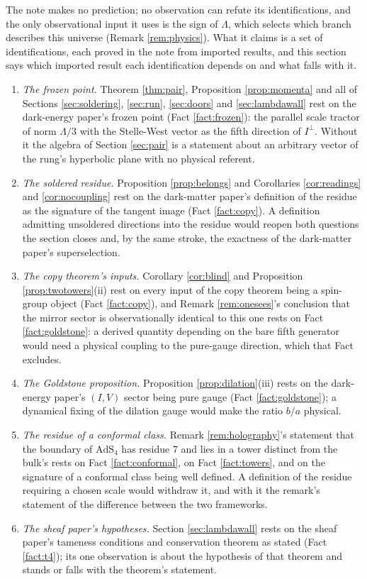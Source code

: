 \documentclass[11pt]{article}
\theoremstyle{definition}
\begin{document}
The note makes no prediction; no observation can refute its identifications, and the only observational input it uses is the sign of $\Lambda$, which selects which branch describes this universe (Remark \ref{rem:physics}). What it claims is a set of identifications, each proved in the note from imported results, and this section says which imported result each identification depends on and what falls with it.
\begin{enumerate}
\item[(D1)] \emph{The frozen point.} Theorem \ref{thm:pair}, Proposition \ref{prop:momenta} and all of Sections \ref{sec:soldering}, \ref{sec:run}, \ref{sec:doors} and \ref{sec:lambdawall} rest on the dark-energy paper's frozen point (Fact \ref{fact:frozen}): the parallel scale tractor of norm $\Lambda/3$ with the Stelle-West vector as the fifth direction of $I^{\perp}$. Without it the algebra of Section \ref{sec:pair} is a statement about an arbitrary vector of the rung's hyperbolic plane with no physical referent.
\item[(D2)] \emph{The soldered residue.} Proposition \ref{prop:belongs} and Corollaries \ref{cor:readings} and \ref{cor:nocoupling} rest on the dark-matter paper's definition of the residue as the signature of the tangent image (Fact \ref{fact:copy}). A definition admitting unsoldered directions into the residue would reopen both questions the section closes and, by the same stroke, the exactness of the dark-matter paper's superselection.
\item[(D3)] \emph{The copy theorem's inputs.} Corollary \ref{cor:blind} and Proposition \ref{prop:twotowers}(ii) rest on every input of the copy theorem being a spin-group object (Fact \ref{fact:copy}), and Remark \ref{rem:onesees}'s conclusion that the mirror sector is observationally identical to this one rests on Fact \ref{fact:goldstone}: a derived quantity depending on the bare fifth generator would need a physical coupling to the pure-gauge direction, which that Fact excludes.
\item[(D4)] \emph{The Goldstone proposition.} Proposition \ref{prop:dilation}(iii) rests on the dark-energy paper's $(I,V)$ sector being pure gauge (Fact \ref{fact:goldstone}); a dynamical fixing of the dilation gauge would make the ratio $b/a$ physical.
\item[(D5)] \emph{The residue of a conformal class.} Remark \ref{rem:holography}'s statement that the boundary of $\mathrm{AdS}_{4}$ has residue $7$ and lies in a tower distinct from the bulk's rests on Fact \ref{fact:conformal}, on Fact \ref{fact:towers}, and on the signature of a conformal class being well defined. A definition of the residue requiring a chosen scale would withdraw it, and with it the remark's statement of the difference between the two frameworks.
\item[(D6)] \emph{The sheaf paper's hypotheses.} Section \ref{sec:lambdawall} rests on the sheaf paper's tameness conditions and conservation theorem as stated (Fact \ref{fact:t4}); its one observation is about the hypothesis of that theorem and stands or falls with the theorem's statement.
\end{enumerate}
\end{document}
